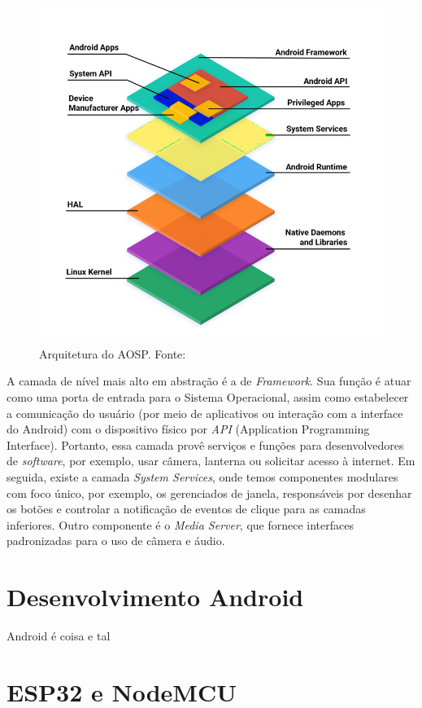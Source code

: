 \begin{figure}[ht]
    \centering
    \includegraphics[width=.55\textwidth]{img/android_stack_720.png}
    \caption{Arquitetura do AOSP. Fonte:\cite{aosp-documentation}}\label{figArchAOSP}
\end{figure}

A camada de nível mais alto em abstração é a de \textit{Framework}. Sua função é atuar como uma porta de entrada para o Sistema Operacional, assim como 
estabelecer a comunicação do usuário (por meio de aplicativos ou interação com a interface do Android) com o dispositivo físico por \textit{API} (Application Programming Interface). 
Portanto, essa camada provê serviços e funções para desenvolvedores de \textit{software}, por exemplo, usar  câmera, lanterna ou solicitar acesso à internet. Em seguida, existe 
a camada \textit{System Services}, onde temos componentes modulares com foco único, por exemplo, os gerenciados de janela, responsáveis por desenhar os botões e controlar a notificação 
de eventos de clique para as camadas inferiores. Outro componente é o \textit{Media Server}, que fornece interfaces padronizadas para o uso de câmera e áudio. 

\section{Desenvolvimento Android}

Android é coisa e tal 

\section{ESP32 e NodeMCU}